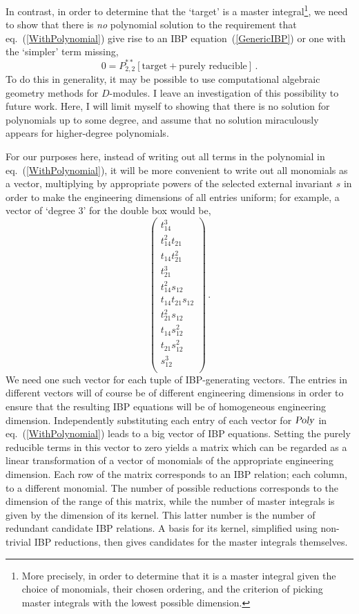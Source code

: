 \documentclass[aps,prd,preprint,groupedaddress,nofootinbib,showpacs,eqsecnum]{revtex4}
\def\eqn#1{eq.~(\ref{#1})}
\def\Pss#1#2{P^{**}_{#1,#2}}
\begin{document}
In contrast, in order to determine that the `target' is a master
integral\footnote{More precisely, in order to determine that
	it is a master integral given the choice of monomials, their
	chosen ordering, and the criterion of picking master integrals
	with the lowest possible \II{} dimension.}, 
we need to show that there is \textit{no\/}
polynomial solution to the requirement that \eqn{WithPolynomial}
give rise to an IBP equation~(\ref{GenericIBP}) 
or one with the `simpler' term missing,
\begin{equation}
0 = \Pss22[\textrm{target} + \textrm{purely\ reducible}]\,.
\end{equation}
To do this in generality, it may be possible to use computational
algebraic geometry methods for $D$-modules.  I leave an investigation
of this possibility to future work.  Here, I will limit myself to showing
that there is no solution for polynomials up to some degree, and
assume that no solution miraculously appears for higher-degree polynomials.

For our purposes here, instead of writing out all terms in the polynomial in
\eqn{WithPolynomial}, it will be more convenient to write out all
monomials as a vector, multiplying by appropriate powers of the
selected external invariant $s$ in order to make the engineering dimensions
of all entries uniform; for example, a vector of `degree 3' for
the double box would be,
\begin{equation}
\left(\begin{matrix}
t_{14}^3\\ t_{14}^2 t_{21}\\ t_{14} t_{21}^2\\ t_{21}^3\\
t_{14}^2 s_{12} \\ t_{14} t_{21} s_{12}\\ t_{21}^2 s_{12}\\ 
t_{14} s_{12}^2 \\ t_{21} s_{12}^2\\ s_{12}^3\\ 
\end{matrix}\right)
\,.
\end{equation}
We need one such vector for each tuple of IBP-generating vectors.
The entries
in different vectors will of course be of different engineering dimensions in order
to ensure that the resulting IBP equations will be of homogeneous
engineering dimension.
Independently substituting each entry of each vector for
$\textsl{Poly\/}$ in \eqn{WithPolynomial} leads to a big vector of IBP equations.
Setting the purely reducible terms in this vector to zero yields
a matrix which can be regarded as a linear transformation of a vector
of monomials of the appropriate engineering dimension.  
Each row of the matrix corresponds to an IBP relation; each
column, to a different monomial.
The number of possible reductions corresponds to the dimension
of the range of this matrix, while the number of master integrals is
given by the dimension of its kernel.  This latter number
is the number of redundant
candidate IBP relations.  A basis for its kernel, simplified using
non-trivial IBP reductions, then
gives candidates for the master integrals themselves.
\end{document}
